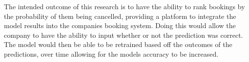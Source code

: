 \begin{itemize}
\end{itemize}
\vspace{5mm}

The intended outcome of this research is to have the ability to rank bookings by the probability of them being cancelled, providing a platform to integrate the model results into the companies booking system. Doing this would allow the company to have the ability to input whether or not the prediction was correct. The model would then be able to be retrained based off the outcomes of the predictions, over time allowing for the models accuracy to be increased. 